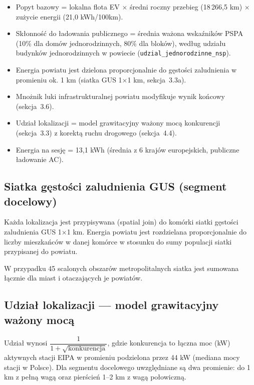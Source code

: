 \documentclass[11pt,a4paper]{article}
\begin{document}
	\begin{itemize}
		\item Popyt bazowy = lokalna flota EV $\times$ średni roczny przebieg (18\,266,5 km) $\times$ zużycie energii (21,0 kWh/100km).
		
		\item Skłonność do ładowania publicznego = średnia ważona wskaźników PSPA (10\% dla domów jednorodzinnych, 80\% dla bloków), według udziału budynków jednorodzinnych w powiecie (\texttt{udzial\_jednorodzinne\_nsp}).
		
		\item Energia powiatu jest dzielona proporcjonalnie do gęstości zaludnienia w promieniu ok. 1 km (siatka GUS 1$\times$1 km, sekcja~3.3a).
		
		\item Mnożnik luki infrastrukturalnej powiatu modyfikuje wynik końcowy (sekcja~3.6).
		
		\item Udział lokalizacji = model grawitacyjny ważony mocą konkurencji (sekcja~3.3) z korektą ruchu drogowego (sekcja~4.4).
		
		\item Energia na sesję = 13,1 kWh (średnia z 6 krajów europejskich, publiczne ładowanie AC).
	\end{itemize}
	
	\subsection{Siatka gęstości zaludnienia GUS (segment docelowy)}
	
	Każda lokalizacja jest przypisywana (spatial join) do komórki siatki gęstości zaludnienia GUS 1$\times$1 km. Energia powiatu jest rozdzielana proporcjonalnie do liczby mieszkańców w danej komórce w stosunku do sumy populacji siatki przypisanej do powiatu.
	
	W przypadku 45 scalonych obszarów metropolitalnych siatka jest sumowana łącznie dla miast i otaczających je powiatów.
	
	\subsection{Udział lokalizacji --- model grawitacyjny ważony mocą}
	
	Udział wynosi $\dfrac{1}{1 + \sqrt{\text{konkurencja}}}$, gdzie konkurencja to łączna moc (kW) aktywnych stacji EIPA w promieniu podzielona przez 44 kW (mediana mocy stacji w Polsce). Dla segmentu docelowego uwzględniane są dwa promienie: do 1 km z pełną wagą oraz pierścień 1--2 km z wagą połowiczną.
	
\end{document}
